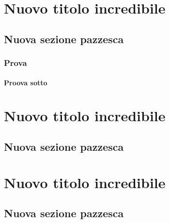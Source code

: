 \documentclass[a4paper, 11pt, openright, twoside]{report}
\begin{document}
\chapter[Nuovo titolo incredibile]{Nuovo titolo incredibile}
\label{chap:Nuovo titolo incredibile}

\lipsum[1]

\section[Nuova sezione pazzesca]{Nuova sezione pazzesca}
\label{chap:Nuova sezione pazzesca}

\subsection[Prova]{Prova}
\label{chap:Prova}

\subsubsection[Proova sotto]{Proova sotto}
\label{chap:Proova sotto}

\chapter[Nuovo titolo incredibile]{Nuovo titolo incredibile}
\label{chap:Nuovo titolo incredibile}

\lipsum[1]

\section[Nuova sezione pazzesca]{Nuova sezione pazzesca}
\label{chap:Nuova sezione pazzesca}

\lipsum[1-2]


\chapter[Nuovo titolo incredibile]{Nuovo titolo incredibile}
\label{chap:Nuovo titolo incredibile}

\lipsum[1]

\section[Nuova sezione pazzesca]{Nuova sezione pazzesca}
\label{chap:Nuova sezione pazzesca}
\end{document}
